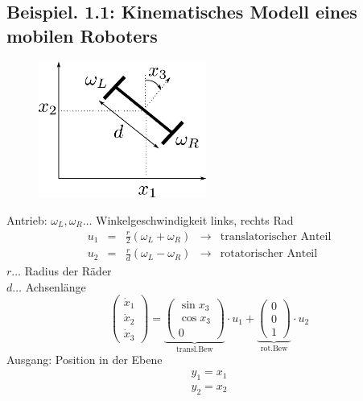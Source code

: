 \documentclass[ngerman]{tudscrreprt}
\begin{document}
\subsection*{\textbf{Beispiel}. 1.1: Kinematisches Modell eines mobilen Roboters}
\begin{figure}[H]
\centering
\def\svgwidth{200pt} 
  \includegraphics[width=5.5cm]{image2.pdf}
\end{figure}
Antrieb: $\omega_L, \omega_R \dots$ Winkelgeschwindigkeit links, rechts Rad
\begin{equation*}
\begin{matrix}
u_1 &=& \frac{r}{2}(\omega_L + \omega_R) &\to &\text{translatorischer Anteil}\\ 
u_2 &=& \frac{r}{d}(\omega_L - \omega_R) &\to &\text{rotatorischer Anteil}
\end{matrix}
\end{equation*}
$r\dots$  Radius der Räder\\ 
$d\dots$  Achsenlänge\\ 

\begin{equation*}
\begin{pmatrix}
\dot{x}_1 \\ 
\dot{x}_2\\ 
\dot x_3
\end{pmatrix}=
\underbrace{
\begin{pmatrix}
\sin{x_3} \\ 
\cos{x_3}\\ 
0
\end{pmatrix}}_{\text{transl.Bew}}\cdot u_1 + 
\underbrace{
\begin{pmatrix}
0\\ 0\\ 1
\end{pmatrix}}_{\text{rot.Bew}} \cdot u_2
\end{equation*}
Ausgang: Position in der Ebene
\begin{equation*}
\begin{matrix}
y_1 = x_1\\
y_2 = x_2
\end{matrix}
\end{equation*}
\end{document}
